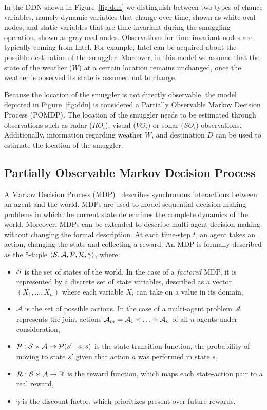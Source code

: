 \documentclass[conference]{IEEEtran}
\begin{document}
In the DDN shown in Figure~\ref{fig:ddn} we distinguish between two types of chance variables, namely dynamic variables that change over time, shown as white oval nodes, and static variables that are time invariant during the smuggling operation, shown as gray oval nodes. Observations for time invariant nodes are typically coming from Intel. For example, Intel can be acquired about the possible destination of the smuggler. Moreover, in this model we assume that the state of the weather ($W$) at a certain location remains unchanged, \ie once the weather is observed its state is assumed not to change.

Because the location of the smuggler is not directly observable, the model depicted in Figure~\ref{fig:ddn} is considered a Partially Observable Markov Decision Process (POMDP). The location of the smuggler needs to be estimated through observations such as radar ($RO_i$), visual ($VO_i$) or sonar ($SO_i$) observations. Additionally, information regarding weather $W$, and destination $D$ can be used to estimate the location of the smuggler.

\subsection{Partially Observable Markov Decision Process}
\label{sub:pomdp}

A Markov Decision Process (MDP)~\cite{bellman1957dynamic,mdp} describes synchronous interactions between an agent and the world. MDPs are used to model sequential decision making problems in which the current state determines the complete dynamics of the world. Moreover, MDPs can be extended to describe multi-agent decision-making without changing the formal description. At each time-step $t$, an agent takes an action, changing the state and collecting a reward. An MDP is formally described as the 5-tuple $\langle\S,\mathcal{A},\P,\R,\gamma\rangle$, where:

\begin{itemize}
\item $\S$ is the set of states of the world. In the case of a \emph{factored} MDP, it is represented by a discrete set of state variables, described as a vector $\left(X_1,\ldots,X_n\right)$ where each variable $X_i$ can take on a value in its domain,
\item $\mathcal{A}$ is the set of possible actions. In the case of a multi-agent problem $\mathcal{A}$ represents the joint actions $\A_{m} = \A_1\times\ldots\times\A_n$ of all $n$ agents under consideration,
\item $\P:\S\times\mathcal{A}\to\P(s'\mid a,s)$ is the state transition function, \ie the probability of moving to state $s'$ given that action $a$ was performed in state $s$,
\item $\R:\S\times\mathcal{A}\to\mathbb{R}$ is the reward function, which maps each state-action pair to a real reward,
\item $\gamma$ is the discount factor, which prioritizes present over future rewards.
\end{itemize}
\end{document}
